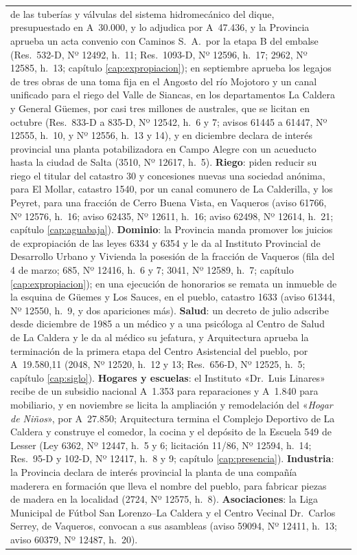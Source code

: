 \begin{longtable}{@{}p{2.7cm}p{10.3cm}@{}}
de las tuberías y válvulas del sistema hidromecánico del dique, presupuestado en A~30.000, y lo adjudica por A~47.436, y la Provincia aprueba un acta convenio con Caminos S.\ A.\ por la etapa B del embalse (Res.\ 532-D, Nº 12492, h.\ 11; Res.\ 1093-D, Nº 12596, h.\ 17; 2962, Nº 12585, h.\ 13; capítulo \ref{cap:expropiacion}); en septiembre aprueba los legajos de tres obras de una toma fija en el Angosto del río Mojotoro y un canal unificado para el riego del Valle de Siancas, en los departamentos La Caldera y General Güemes, por casi tres millones de australes, que se licitan en octubre (Res.\ 833-D a 835-D, Nº 12542, h.\ 6 y 7; avisos 61445 a 61447, Nº 12555, h.\ 10, y Nº 12556, h.\ 13 y 14), y en diciembre declara de interés provincial una planta potabilizadora en Campo Alegre con un acueducto hasta la ciudad de Salta (3510, Nº 12617, h.\ 5). \textbf{Riego}: piden reducir su riego el titular del catastro 30 y concesiones nuevas una sociedad anónima, para El Mollar, catastro 1540, por un canal comunero de La Calderilla, y los Peyret, para una fracción de Cerro Buena Vista, en Vaqueros (aviso 61766, Nº 12576, h.\ 16; aviso 62435, Nº 12611, h.\ 16; aviso 62498, Nº 12614, h.\ 21; capítulo \ref{cap:aguabaja}). \textbf{Dominio}: la Provincia manda promover los juicios de expropiación de las leyes 6334 y 6354 y le da al Instituto Provincial de Desarrollo Urbano y Vivienda la posesión de la fracción de Vaqueros (fila del 4 de marzo; 685, Nº 12416, h.\ 6 y 7; 3041, Nº 12589, h.\ 7; capítulo \ref{cap:expropiacion}); en una ejecución de honorarios se remata un inmueble de la esquina de Güemes y Los Sauces, en el pueblo, catastro 1633 (aviso 61344, Nº 12550, h.\ 9, y dos apariciones más). \textbf{Salud}: un decreto de julio adscribe desde diciembre de 1985 a un médico y a una psicóloga al Centro de Salud de La Caldera y le da al médico su jefatura, y Arquitectura aprueba la terminación de la primera etapa del Centro Asistencial del pueblo, por A~19.580,11 (2048, Nº 12520, h.\ 12 y 13; Res.\ 656-D, Nº 12525, h.\ 5; capítulo \ref{cap:siglo}). \textbf{Hogares y escuelas}: el Instituto «Dr.\ Luis Linares» recibe de un subsidio nacional A~1.353 para reparaciones y A~1.840 para mobiliario, y en noviembre se licita la ampliación y remodelación del «\textit{Hogar de Niños}», por A~27.850; Arquitectura termina el Complejo Deportivo de La Caldera y construye el comedor, la cocina y el depósito de la Escuela 549 de Lesser (Ley 6362, Nº 12447, h.\ 5 y 6; licitación 11/86, Nº 12594, h.\ 14; Res.\ 95-D y 102-D, Nº 12417, h.\ 8 y 9; capítulo \ref{cap:presencia}). \textbf{Industria}: la Provincia declara de interés provincial la planta de una compañía maderera en formación que lleva el nombre del pueblo, para fabricar piezas de madera en la localidad (2724, Nº 12575, h.\ 8). \textbf{Asociaciones}: la Liga Municipal de Fútbol San Lorenzo--La Caldera y el Centro Vecinal Dr.\ Carlos Serrey, de Vaqueros, convocan a sus asambleas (aviso 59094, Nº 12411, h.\ 13; aviso 60379, Nº 12487, h.\ 20). \\

\end{longtable}
